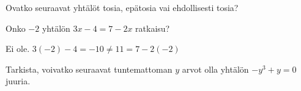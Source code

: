 \begin{tehtavasivu}



\begin{tehtava}
Ovatko seuraavat yhtälöt tosia, epätosia vai ehdollisesti tosia?
  \begin{alakohdat}
  \end{alakohdat}

     \begin{vastaus}
	\begin{alakohdat}
	\end{alakohdat}
    \end{vastaus}
\end{tehtava}

\begin{tehtava}
Onko $-2$ yhtälön $3x-4 = 7-2x$ ratkaisu?
\begin{vastaus}
Ei ole. $3(-2)-4 = -10 \ne 11=7-2(-2)$
\end{vastaus}
\end{tehtava}

\begin{tehtava}
Tarkista, voivatko seuraavat tuntemattoman $y$ arvot olla yhtälön $-y^3+y=0$ juuria.
  \begin{alakohdat}
  \end{alakohdat}

  \begin{vastaus}
    \begin{alakohdat}
    \end{alakohdat}
  \end{vastaus}
\end{tehtava}



\end{tehtavasivu}
